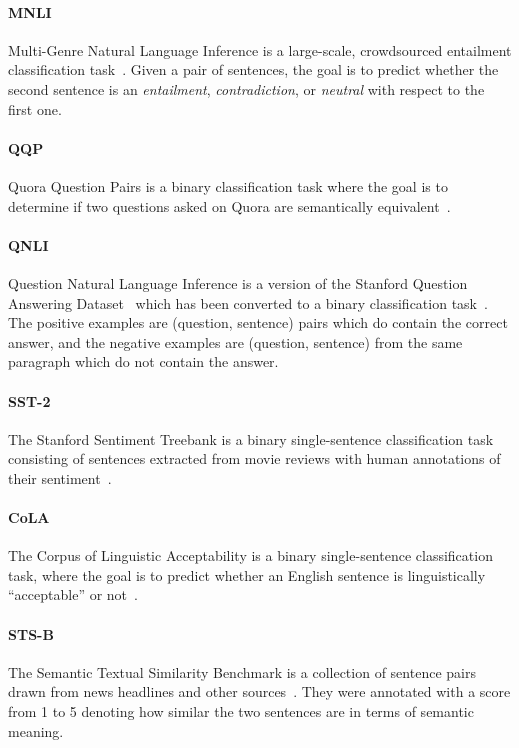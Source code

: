 \documentclass[11pt,a4paper]{article}
\begin{document}
\paragraph{MNLI} Multi-Genre Natural Language Inference is a large-scale, crowdsourced entailment classification task~\cite{williams-nangia-bowman:2018}. Given a pair of sentences, the goal is to predict whether the second sentence is an {\it entailment}, {\it contradiction}, or {\it neutral} with respect to the first one.

\paragraph{QQP} Quora Question Pairs is a binary classification task where the goal is to determine if two questions asked on Quora are semantically equivalent~\cite{chen-etal:2018:_quora}.

\paragraph{QNLI} Question Natural Language Inference is a version of the Stanford Question Answering Dataset~\cite{rajpurkar-etal:2016:_squad} which has been converted to a binary classification task~\cite{wang-etal:2018:_glue}. The positive examples are (question, sentence) pairs which do contain the correct answer, and the negative examples are (question, sentence) from the same paragraph which do not contain the answer.

\paragraph{SST-2} The Stanford Sentiment Treebank is a binary single-sentence classification task consisting of sentences extracted from movie reviews with human annotations of their sentiment~\cite{socher-etal:2013:_recur}.

\paragraph{CoLA} The Corpus of Linguistic Acceptability is a binary single-sentence classification task, where the goal is to predict whether an English sentence is linguistically ``acceptable'' or not~\cite{warstadt-singh-bowman:2018:_corpus}.

\paragraph{STS-B} The Semantic Textual Similarity Benchmark is a collection of sentence pairs drawn from news headlines and other sources~\cite{cer-etal:2017}. They were annotated with a score from 1 to 5 denoting how similar the two sentences are in terms of semantic meaning. 
\end{document}
